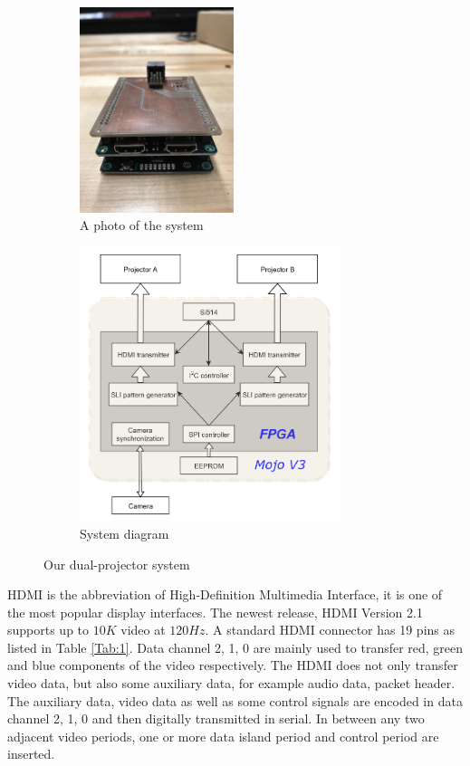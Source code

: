 \documentclass[]{spie}  %
\begin{document}
\begin{figure}
\centering
\begin{subfigure}{.5\textwidth}
  \centering
  \includegraphics[height=6cm]{mojo.jpg}
  \caption{A photo of the system}
  \label{fig:sub1}
\end{subfigure}%
\begin{subfigure}{.5\textwidth}
  \centering
   \includegraphics[height=8cm]{sysdgv2.png}
  \caption{System diagram}
  \label{fig:sub2}
\end{subfigure}
\caption{Our dual-projector system}
\label{Fig:2}
\end{figure}

HDMI is the abbreviation of High-Definition Multimedia Interface, it is one of the most popular display interfaces. The newest release, HDMI Version 2.1 supports up to $10K$ video at $120 Hz$. A standard HDMI connector has 19 pins as listed in Table \ref{Tab:1}. Data channel 2, 1, 0 are mainly used to transfer red, green and blue components of the video respectively. The HDMI does not only transfer video data, but also some auxiliary data, for example audio data, packet header. The auxiliary data, video data as well as some control signals are encoded in data channel 2, 1, 0 and then digitally transmitted in serial. In between any two adjacent video periods, one or more data island period and control period are inserted. 
\end{document}
